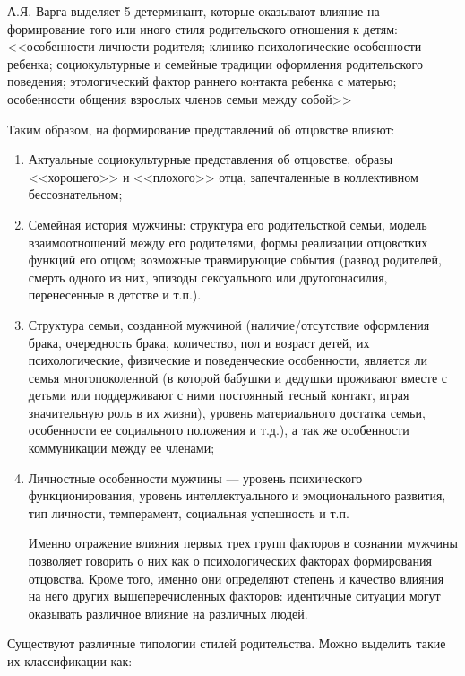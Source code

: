 \documentclass{../../common/thesisbyxetex}
\begin{document}
А.Я. Варга выделяет 5 детерминант, которые оказывают влияние на формирование того или иного стиля
родительского отношения к детям: <<особенности личности родителя; клинико-психологические
особенности ребенка; социокультурные и семейные традиции оформления родительского поведения;
этологический фактор раннего контакта ребенка с матерью; особенности общения взрослых членов семьи
между собой>> \cite[16]{varga}


Таким образом, на формирование представлений об отцовстве влияют:

\begin{enumerate}
	\item Актуальные социокультурные представления об отцовстве, образы <<хорошего>> и <<плохого>>
отца, запечталенные в коллективном бессознательном;

    \item Семейная история мужчины: структура его родительсткой семьи,  модель взаимоотношений
между его родителями, формы реализации отцовстких функций его отцом; возможные травмирующие события
(развод родителей, смерть одного из них, эпизоды сексуального или другогонасилия, перенесенные в
детстве и т.п.).

	\item Структура семьи, созданной мужчиной (наличие/отсутствие оформления брака,
очередность брака, количество, пол и возраст детей, их психологические, физические и
поведенческие особенности, является ли семья многопоколенной (в которой бабушки и дедушки
проживают вместе с детьми или поддерживают с ними постоянный тесный контакт, играя
значительную роль в их жизни), уровень материального достатка семьи, особенности ее социального
положения и т.д.), а так же  особенности коммуникации между ее членами;

	\item Личностные особенности мужчины --- уровень психического функционирования,
уровень интеллектуального и эмоционального развития, тип личности, темперамент, социальная
успешность и т.п.

Именно отражение влияния первых трех групп факторов в сознании мужчины позволяет говорить о них как
о психологических факторах формирования отцовства. Кроме того, именно они определяют степень и
качество влияния на него других вышеперечисленных факторов: идентичные ситуации могут оказывать
различное влияние на различных людей.
\end{enumerate}


Существуют различные типологии стилей родительства. Можно выделить такие их классификации как:
\end{document}
